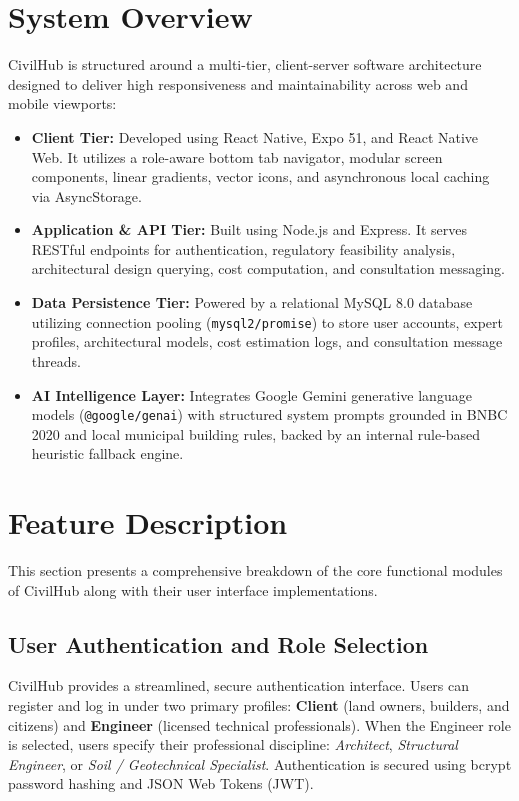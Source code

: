 \documentclass[12pt,a4paper]{article}
\begin{document}
\section{System Overview}
CivilHub is structured around a multi-tier, client-server software architecture designed to deliver high responsiveness and maintainability across web and mobile viewports:
\begin{itemize}
    \item \textbf{Client Tier:} Developed using React Native, Expo 51, and React Native Web. It utilizes a role-aware bottom tab navigator, modular screen components, linear gradients, vector icons, and asynchronous local caching via AsyncStorage.
    \item \textbf{Application \& API Tier:} Built using Node.js and Express. It serves RESTful endpoints for authentication, regulatory feasibility analysis, architectural design querying, cost computation, and consultation messaging.
    \item \textbf{Data Persistence Tier:} Powered by a relational MySQL 8.0 database utilizing connection pooling (\texttt{mysql2/promise}) to store user accounts, expert profiles, architectural models, cost estimation logs, and consultation message threads.
    \item \textbf{AI Intelligence Layer:} Integrates Google Gemini generative language models (\texttt{@google/genai}) with structured system prompts grounded in BNBC 2020 and local municipal building rules, backed by an internal rule-based heuristic fallback engine.
\end{itemize}

\section{Feature Description}
This section presents a comprehensive breakdown of the core functional modules of CivilHub along with their user interface implementations.

\subsection{User Authentication and Role Selection}
CivilHub provides a streamlined, secure authentication interface. Users can register and log in under two primary profiles: \textbf{Client} (land owners, builders, and citizens) and \textbf{Engineer} (licensed technical professionals). When the Engineer role is selected, users specify their professional discipline: \textit{Architect}, \textit{Structural Engineer}, or \textit{Soil / Geotechnical Specialist}. Authentication is secured using bcrypt password hashing and JSON Web Tokens (JWT).
\end{document}
